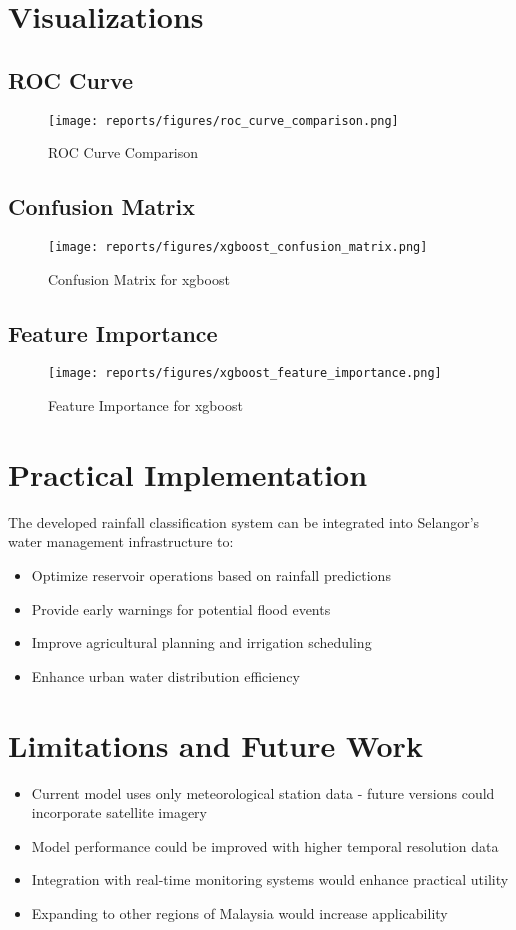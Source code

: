 \documentclass{article}
\begin{document}
\section{Visualizations}

\subsection{ROC Curve}
\begin{figure}[h]
\centering
\texttt{[image: reports/figures/roc\_curve\_comparison.png]}
\caption{ROC Curve Comparison}
\end{figure}

\subsection{Confusion Matrix}
\begin{figure}[h]
\centering
\texttt{[image: reports/figures/xgboost\_confusion\_matrix.png]}
\caption{Confusion Matrix for xgboost}
\end{figure}

\subsection{Feature Importance}
\begin{figure}[h]
\centering
\texttt{[image: reports/figures/xgboost\_feature\_importance.png]}
\caption{Feature Importance for xgboost}
\end{figure}

\section{Practical Implementation}
The developed rainfall classification system can be integrated into Selangor's water management infrastructure to:
\begin{itemize}
    \item Optimize reservoir operations based on rainfall predictions
    \item Provide early warnings for potential flood events
    \item Improve agricultural planning and irrigation scheduling
    \item Enhance urban water distribution efficiency
\end{itemize}

\section{Limitations and Future Work}
\begin{itemize}
    \item Current model uses only meteorological station data - future versions could incorporate satellite imagery
    \item Model performance could be improved with higher temporal resolution data
    \item Integration with real-time monitoring systems would enhance practical utility
    \item Expanding to other regions of Malaysia would increase applicability
\end{itemize}
\end{document}
